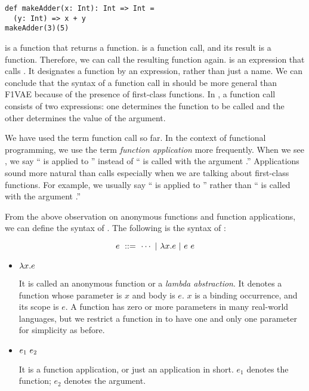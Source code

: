 \begin{verbatim}
def makeAdder(x: Int): Int => Int =
  (y: Int) => x + y
makeAdder(3)(5)
\end{verbatim}

 is a function that returns a function.  is a
function call, and its result is a function. Therefore, we can call the
resulting function again.  is an expression that calls
. It designates a function by an expression, rather than just
a name. We can conclude that the syntax of a function call in \lang should be
more general than \textsf{F1VAE} because of the presence of first-class
functions. In \lang, a function call consists of two expressions: one determines
the function to be called and the other determines the value of the argument.

We have used the term function call so far. In the context of functional
programming, we use the term \textit{function application} more frequently. When we see , we say `` is
applied to '' instead of `` is called with the argument
.'' Applications sound more natural than calls especially when we are
talking about first-class functions. For example, we usually say
`` is applied to '' rather than ``
is called with the argument .''

From the above observation on anonymous functions and function applications,
we can define the syntax of \lang. The following is the syntax of \lang:

\[ e\ ::=\ \cdots\ |\ \efun{x}{e}\ |\ \eapp{e}{e} \]

\begin{itemize}
  \item $\lambda x.e$

    It is called an anonymous function or a \textit{lambda abstraction}.
    It denotes a function whose parameter is $x$ and body is $e$. $x$ is a
    binding occurrence, and its scope is $e$.
    A function has zero or more parameters in many real-world languages,
    but we restrict a function in \lang to have one and only one parameter for
    simplicity as before.

  \item $e_1\ e_2$

    It is a function application, or just an application in short.
    $e_1$ denotes the function; $e_2$ denotes the argument.
\end{itemize}

